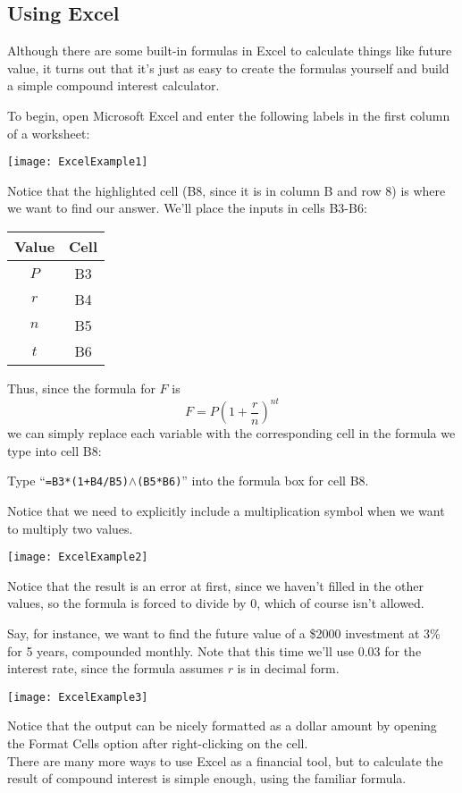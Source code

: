 \subsection{Using Excel}
Although there are some built-in formulas in Excel to calculate things like future value, it turns out that it's just as easy to create the formulas yourself and build a simple compound interest calculator.

To begin, open Microsoft Excel and enter the following labels in the first column of a worksheet:
\begin{center}
\texttt{[image: ExcelExample1]}
\end{center}

Notice that the highlighted cell (B8, since it is in column B and row 8) is where we want to find our answer.  We'll place the inputs in cells B3-B6:
\begin{center}
\begin{tabular}{c c}
\textbf{Value} & \textbf{Cell}\\
\hline
$P$ & B3\\
$r$ & B4\\
$n$ & B5\\
$t$ & B6
\end{tabular}
\end{center}

Thus, since the formula for $F$ is 
\[F = P\left(1+\dfrac{r}{n}\right)^{nt}\]
we can simply replace each variable with the corresponding cell in the formula we type into cell B8:
\begin{center}
Type ``\texttt{=B3*(1+B4/B5)}$\wedge$\texttt{(B5*B6)}'' into the formula box for cell B8.
\end{center}
Notice that we need to explicitly include a multiplication symbol when we want to multiply two values.
\begin{center}
\texttt{[image: ExcelExample2]}
\end{center}

Notice that the result is an error at first, since we haven't filled in the other values, so the formula is forced to divide by 0, which of course isn't allowed.
\vfill
\pagebreak

Say, for instance, we want to find the future value of a \$2000 investment at 3\% for 5 years, compounded monthly.  Note that this time we'll use 0.03 for the interest rate, since the formula assumes $r$ is in decimal form.
\begin{center}
\texttt{[image: ExcelExample3]}
\end{center}

Notice that the output can be nicely formatted as a dollar amount by opening the Format Cells option after right-clicking on the cell.\\

There are many more ways to use Excel as a financial tool, but to calculate the result of compound interest is simple enough, using the familiar formula.